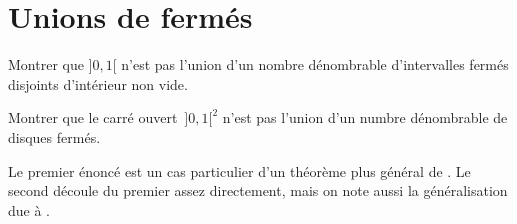 \section{Unions de fermés}

\def\zuo{\rbrack 0,1\lbrack}
Montrer que $\zuo$ n'est pas l'union d'un nombre dénom\-brable d'inter\-valles fermés disjoints d'intérieur non vide.

Montrer que le carré ouvert~$\zuo^2$ n'est pas l'union d'un numbre dénombrable de disques fermés.

\begin{em}
  Le premier énoncé est un cas particulier d'un théorème plus général de \textcite{Sierpinski_1918}. Le second découle du premier assez directement, mais on note aussi la généralisation due à \textcite{Dijkstra_1984}.
\end{em}

